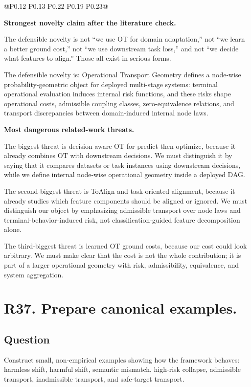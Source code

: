 \documentclass[11pt,a4paper]{article}
\begin{document}
\begin{landscape}
\begin{longtable}{@{}P{0.12\linewidth} P{0.13\linewidth} P{0.22\linewidth} P{0.19\linewidth} P{0.23\linewidth}@{}}
\end{longtable}
\end{landscape}

\textbf{Strongest novelty claim after the literature check.}

The defensible novelty is not ``we use OT for domain adaptation,'' not ``we learn a better ground cost,'' not ``we use downstream task loss,'' and not ``we decide what features to align.'' Those all exist in serious forms.

The defensible novelty is: Operational Transport Geometry defines a node-wise probability-geometric object for deployed multi-stage systems: terminal operational evaluation induces internal risk functions, and these risks shape operational costs, admissible coupling classes, zero-equivalence relations, and transport discrepancies between domain-induced internal node laws.

\textbf{Most dangerous related-work threats.}

The biggest threat is decision-aware OT for predict-then-optimize, because it already combines OT with downstream decisions. We must distinguish it by saying that it compares datasets or task instances using downstream decisions, while we define internal node-wise operational geometry inside a deployed DAG.

The second-biggest threat is ToAlign and task-oriented alignment, because it already studies which feature components should be aligned or ignored. We must distinguish our object by emphasizing admissible transport over node laws and terminal-behavior-induced risk, not classification-guided feature decomposition alone.

The third-biggest threat is learned OT ground costs, because our cost could look arbitrary. We must make clear that the cost is not the whole contribution; it is part of a larger operational geometry with risk, admissibility, equivalence, and system aggregation.

\section*{R37. Prepare canonical examples.}

\subsection*{Question}

Construct small, non-empirical examples showing how the framework behaves: harmless shift, harmful shift, semantic mismatch, high-risk collapse, admissible transport, inadmissible transport, and safe-target transport.
\end{document}
